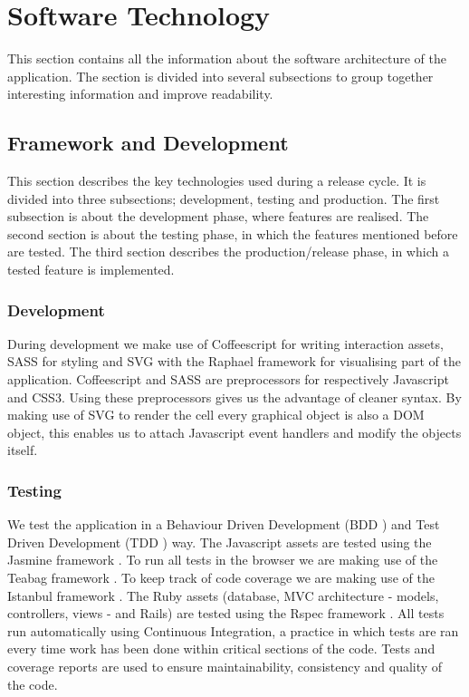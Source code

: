 \documentclass{report}
\begin{document}
	\clearpage
	\section{Software Technology}
		This section contains all the information about the software architecture of the application. The section is divided into several subsections to group together interesting information and improve readability.	
		
		\subsection{Framework and Development}
			This section describes the key technologies used during a release cycle.
			It is divided into three subsections; development, testing and production.
			The first subsection is about the development phase, where features are realised.
			The second section is about the testing phase, in which the features mentioned before are tested.
			The third section describes the production/release phase, in which a tested feature is implemented.
			
			\subsubsection{Development}
				During development we make use of Coffeescript\cite{coffeescript} for writing interaction assets, SASS\cite{sass} for styling and SVG\cite{svg} with the Raphael\cite{raphael} framework for visualising part of the application.
				Coffeescript and SASS are preprocessors for respectively Javascript and CSS3. Using these preprocessors gives us the advantage of cleaner syntax.
				By making use of SVG to render the cell every graphical object is also a DOM object, this enables us to attach Javascript event handlers and modify the objects itself.
				
			\subsubsection{Testing}
				We test the application in a Behaviour Driven Development (BDD \cite{bdd}) and Test Driven Development (TDD \cite{tdd} ) way. 
				The Javascript assets are tested using the Jasmine framework \cite{jasmine}. 
				To run all tests in the browser we are making use of the Teabag framework \cite{teabag}. 
				To keep track of code coverage we are making use of the Istanbul framework \cite{istanbul}.
				The Ruby assets (database, MVC architecture - models, controllers, views - and Rails) are tested using the Rspec framework \cite{rspec}.  
				All tests run automatically using Continuous Integration, a practice in which tests are ran every time work has been done within critical sections of the code. 
				Tests and coverage reports are used to ensure maintainability, consistency and quality of the code.
				
\end{document}
